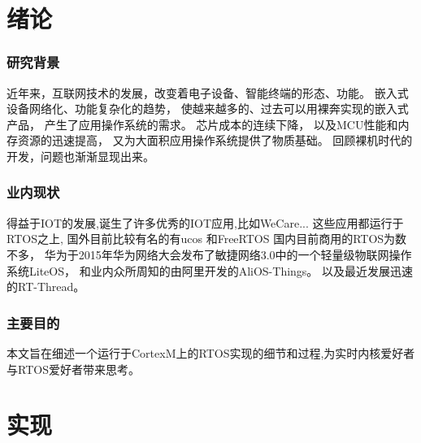 
\iffalse
\fi


\chapter{绪论}
\subsection{研究背景}
近年来，互联网技术的发展，改变着电子设备、智能终端的形态、功能。
嵌入式设备网络化、功能复杂化的趋势，
使越来越多的、过去可以用裸奔实现的嵌入式产品，
产生了应用操作系统的需求。
芯片成本的连续下降，
以及MCU性能和内存资源的迅速提高，
又为大面积应用操作系统提供了物质基础。
回顾裸机时代的开发，问题也渐渐显现出来。

\subsection{业内现状}
得益于IOT的发展,诞生了许多优秀的IOT应用,比如WeCare\cite{pinto2017we}...
这些应用都运行于RTOS之上,
国外目前比较有名的有ucos \cite{labrosse2010uc}和FreeRTOS\cite{barry2008freertos}
国内目前商用的RTOS为数不多，
华为于2015年华为网络大会发布了敏捷网络3.0中的一个轻量级物联网操作系统LiteOS\cite{cao2008liteos}，
和业内众所周知的由阿里开发的AliOS-Things。
以及最近发展迅速的RT-Thread。

\subsection{主要目的}
本文旨在细述一个运行于CortexM\cite{valvano2013embedded}上的RTOS实现的细节和过程,为实时内核爱好者与RTOS爱好者带来思考。




\chapter{实现}

